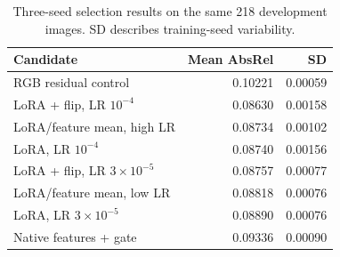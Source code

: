 \begin{table}[t]
\centering\small
\caption{Three-seed selection results on the same 218 development images. SD describes training-seed variability.}
\begin{tabular}{lrr}
\toprule
Candidate & Mean AbsRel & SD\\
\midrule
RGB residual control & 0.10221 & 0.00059\\
LoRA + flip, LR $10^{-4}$ & 0.08630 & 0.00158\\
LoRA/feature mean, high LR & 0.08734 & 0.00102\\
LoRA, LR $10^{-4}$ & 0.08740 & 0.00156\\
LoRA + flip, LR $3\times10^{-5}$ & 0.08757 & 0.00077\\
LoRA/feature mean, low LR & 0.08818 & 0.00076\\
LoRA, LR $3\times10^{-5}$ & 0.08890 & 0.00076\\
Native features + gate & 0.09336 & 0.00090\\
\bottomrule
\end{tabular}
\end{table}
